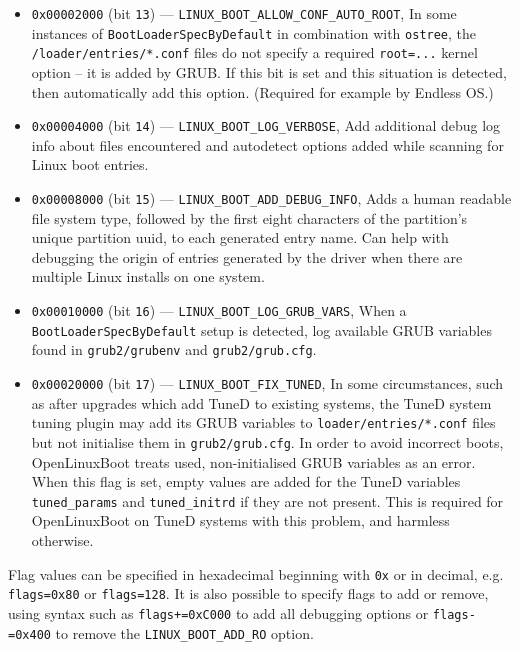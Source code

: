 \documentclass[]{article}
\begin{document}
\begin{itemize}
\begin{itemize}
    \item \texttt{0x00002000} (bit \texttt{13}) --- \texttt{LINUX\_BOOT\_ALLOW\_CONF\_AUTO\_ROOT},
    In some instances of \texttt{BootLoaderSpecByDefault} in combination with \texttt{ostree}, the
    \texttt{/loader/entries/*.conf} files do not specify a required \texttt{root=...} kernel
    option -- it is added by GRUB. If this bit is set and this situation is detected, then
    automatically add this option. (Required for example by Endless OS.)
    \item \texttt{0x00004000} (bit \texttt{14}) --- \texttt{LINUX\_BOOT\_LOG\_VERBOSE},
    Add additional debug log info about files encountered and autodetect options added while scanning for
    Linux boot entries.
    \item \texttt{0x00008000} (bit \texttt{15}) --- \texttt{LINUX\_BOOT\_ADD\_DEBUG\_INFO},
    Adds a human readable file system type, followed by the first eight characters of the
    partition's unique partition uuid, to each generated entry name. Can help with debugging
    the origin of entries generated by the driver when there are multiple Linux installs on
    one system.
    \item \texttt{0x00010000} (bit \texttt{16}) --- \texttt{LINUX\_BOOT\_LOG\_GRUB\_VARS},
    When a \texttt{BootLoaderSpecByDefault} setup is detected, log available GRUB variables
    found in \texttt{grub2/grubenv} and \texttt{grub2/grub.cfg}.
    \item \texttt{0x00020000} (bit \texttt{17}) --- \texttt{LINUX\_BOOT\_FIX\_TUNED},
    In some circumstances, such as after upgrades which add TuneD to existing systems, the TuneD
    system tuning plugin may add its GRUB variables to \texttt{loader/entries/*.conf} files but not
    initialise them in \texttt{grub2/grub.cfg}. In order to avoid incorrect boots, OpenLinuxBoot
    treats used, non-initialised GRUB variables as an error. When this flag is set, empty values
    are added for the TuneD variables \texttt{tuned\_params} and \texttt{tuned\_initrd} if they
    are not present. This is required for OpenLinuxBoot on TuneD systems with this problem, and
    harmless otherwise.
  \end{itemize} \medskip

  Flag values can be specified in hexadecimal beginning with \texttt{0x} or in decimal,
  e.g. \texttt{flags=0x80} or \texttt{flags=128}. It is also possible to specify flags to
  add or remove, using syntax such as \texttt{flags+=0xC000} to add all debugging
  options or \texttt{flags-=0x400} to remove the \texttt{LINUX\_BOOT\_ADD\_RO} option. \medskip


\end{itemize}
\end{document}
